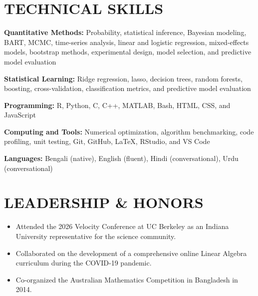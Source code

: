 \documentclass[10pt,letterpaper]{article}
\newenvironment{resumeItems}{%
	\begin{itemize}[
		label=\textbullet,
		leftmargin=14pt,
		labelsep=5pt,
		itemsep=0.5pt,
		topsep=1.0pt,
		parsep=0pt,
		partopsep=0pt
	]
}{%
	\end{itemize}
}
\begin{document}
\section*{TECHNICAL SKILLS}

\textbf{Quantitative Methods:}
Probability, statistical inference, Bayesian modeling, BART, MCMC, time-series analysis, linear and logistic regression, mixed-effects models, bootstrap methods, experimental design, model selection, and predictive model evaluation

\textbf{Statistical Learning:}
Ridge regression, lasso, decision trees, random forests, boosting, cross-validation, classification metrics, and predictive model evaluation

\textbf{Programming:}
R, Python, C, C++, MATLAB, Bash, HTML, CSS, and JavaScript

\textbf{Computing and Tools:}
Numerical optimization, algorithm benchmarking, code profiling, unit testing, Git, GitHub, LaTeX, RStudio, and VS Code

\textbf{Languages:}
Bengali (native), English (fluent), Hindi (conversational), Urdu (conversational)

\section*{LEADERSHIP \& HONORS}

\begin{resumeItems}
	\item Attended the 2026 Velocity Conference at UC Berkeley as an Indiana University representative for the science community.

	\item Collaborated on the development of a comprehensive online Linear Algebra curriculum during the COVID-19 pandemic.

	\item Co-organized the Australian Mathematics Competition in Bangladesh in 2014.
\end{resumeItems}
\end{document}
